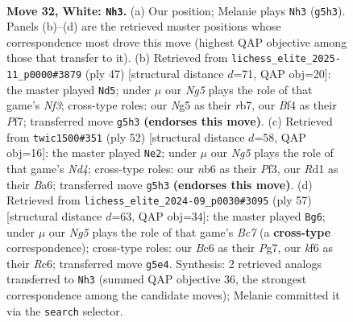 \documentclass[11pt]{article}
\begin{document}
\clearpage

\begin{figure}[p]\centering
\begin{subfigure}{0.46\textwidth}\centering
\resizebox{\linewidth}{!}{%
\newchessgame
\chessboard[
  setfen={7r/r7/pnB1bkp1/p4pNp/5B2/P4PP1/1P5P/RK1R4 w - - 0 32},
  showmover=false,
  pgfstyle=straightmove, color=movearrow, markmove={g5-h3}
]}
\caption{}
\end{subfigure}\hfill
\begin{subfigure}{0.46\textwidth}\centering
\resizebox{\linewidth}{!}{%
\newchessgame
\chessboard[
  setfen={4k2r/1R1bpp1p/p4np1/4P3/8/2r3BP/P2N1PP1/4R1K1 b k - 0 24},
  showmover=false,
  pgfstyle=straightmove, color=movearrow, markmove={f6-d5}
]}
\caption{}
\end{subfigure}
\\[4pt]
\begin{subfigure}{0.46\textwidth}\centering
\resizebox{\linewidth}{!}{%
\newchessgame
\chessboard[
  setfen={r3b1k1/p4pp1/Bp2pbn1/7p/1B1N4/P4PP1/1PP3P1/2KR4 w - - 2 27},
  showmover=false,
  pgfstyle=straightmove, color=movearrow, markmove={d4-e2}
]}
\caption{}
\end{subfigure}\hfill
\begin{subfigure}{0.46\textwidth}\centering
\resizebox{\linewidth}{!}{%
\newchessgame
\chessboard[
  setfen={4r2k/5ppp/2r1p3/p1Bp3n/3P3P/1P2PP2/P1b2K1P/R1R5 b - - 1 29},
  showmover=false,
  pgfstyle=straightmove, color=movearrow, markmove={c2-g6}
]}
\caption{}
\end{subfigure}
\caption{\textbf{Move 32, White: \texttt{Nh3}.} (a) Our position; Melanie plays \texttt{Nh3} (\texttt{g5h3}). Panels (b)--(d) are the retrieved master positions whose correspondence most drove this move (highest QAP objective among those that transfer to it). (b) Retrieved from \texttt{lichess\_elite\_2025-11\_p0000\#3879} (ply 47) [structural distance $d$=71, QAP obj=20]: the master played \texttt{Nd5}; under $\mu$ our \emph{Ng5} plays the role of that game's \emph{Nf3}; cross-type roles: our \emph{N}g5 as their \emph{r}b7, our \emph{B}f4 as their \emph{P}f7; transferred move \texttt{g5h3} \textbf{(endorses this move)}. (c) Retrieved from \texttt{twic1500\#351} (ply 52) [structural distance $d$=58, QAP obj=16]: the master played \texttt{Ne2}; under $\mu$ our \emph{Ng5} plays the role of that game's \emph{Nd4}; cross-type roles: our \emph{n}b6 as their \emph{P}f3, our \emph{R}d1 as their \emph{B}a6; transferred move \texttt{g5h3} \textbf{(endorses this move)}. (d) Retrieved from \texttt{lichess\_elite\_2024-09\_p0030\#3095} (ply 57) [structural distance $d$=63, QAP obj=34]: the master played \texttt{Bg6}; under $\mu$ our \emph{Ng5} plays the role of that game's \emph{Bc7} (a \textbf{cross-type} correspondence); cross-type roles: our \emph{B}c6 as their \emph{P}g7, our \emph{k}f6 as their \emph{R}c6; transferred move \texttt{g5e4}. Synthesis: 2 retrieved analogs transferred to \texttt{Nh3} (summed QAP objective 36, the strongest correspondence among the candidate moves); Melanie committed it via the \texttt{search} selector.}
\label{fig:thought-m62}
\end{figure}
\end{document}
